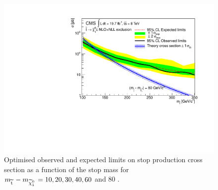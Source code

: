 \begin{figure}[!Hhtb]
\begin{center}
  \includegraphics[scale=0.39]{Figures/sus13009/limits/Limit80.pdf}
  \caption{Optimised observed and expected limits on stop production cross section as a function of the stop mass for $m_{\widetilde{{\rm t}}\,} - m_{\widetilde{\chi}^{0}_{1}\,} = 10, 20, 30, 40, 60$ and 80 \GeV.}
  \label{fig:stop_limits}
  \end{center}
\end{figure}




